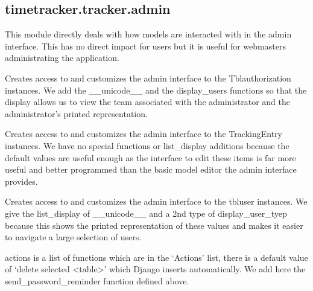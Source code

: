 \documentclass[letterpaper,10pt,english]{sphinxmanual}
\begin{document}
\subsection{timetracker.tracker.admin}
\label{timetracker:timetracker-tracker-admin}\label{timetracker:module-timetracker.tracker.admin}
This module directly deals with how models are interacted with in the admin
interface. This has no direct impact for users but it is useful for webmasters
administrating the application.

\begin{fulllineitems}
\label{timetracker:timetracker.tracker.admin.AuthAdmin}
Creates access to and customizes the admin interface to the
Tblauthorization instances. We add the \_\_unicode\_\_ and the display\_users
functions so that the display allows us to view the team associated with
the administrator and the administrator's printed representation.

\end{fulllineitems}


\begin{fulllineitems}
\label{timetracker:timetracker.tracker.admin.TrackerAdmin}
Creates access to and customizes the admin interface to the
TrackingEntry instances. We have no special functions or list\_display
additions because the default values are useful enough as the interface to
edit these items is far more useful and better programmed than the basic
model editor the admin interface provides.

\end{fulllineitems}


\begin{fulllineitems}
\label{timetracker:timetracker.tracker.admin.UserAdmin}
Creates access to and customizes the admin interface to the tbluser
instances. We give the list\_display of \_\_unicode\_\_ and a 2nd type of
display\_user\_tyep because this shows the printed representation of these
values and makes it easier to navigate a large selection of users.

actions is a list of functions which are in the `Actions' list, there is a
default value of `delete selected \textless{}table\textgreater{}' which Django inserts
automatically. We add here the send\_password\_reminder function defined
above.

\end{fulllineitems}
\end{document}
